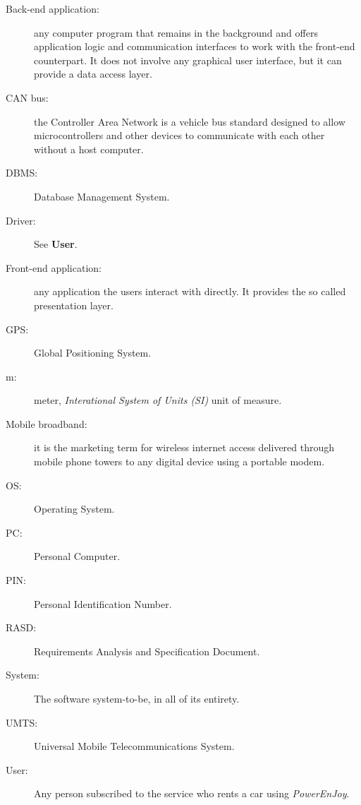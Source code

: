 \begin{description}
\item[Back-end application:] any computer program that remains in the background and offers application logic and communication interfaces to work with the front-end counterpart. It does not involve any graphical user interface, but it can provide a data access layer.
\item[CAN bus:] the Controller Area Network is a vehicle bus standard designed to allow microcontrollers and other devices to communicate with each other without a host computer.
\item[DBMS:] Database Management System.
\item[Driver:] See \textbf{User}.
\item[Front-end application:] any application the users interact with directly. It provides the so called presentation layer.
\item[GPS:] Global Positioning System.
\item[m:] meter, \emph{Interational System of Units (SI)} unit of measure.
\item[Mobile broadband:] it is the marketing term for wireless internet access delivered through mobile phone towers to any digital device using a portable modem.
\item[OS:] Operating System.
\item[PC:] Personal Computer.
\item[PIN:] Personal Identification Number.
\item[RASD:] Requirements Analysis and Specification Document.
\item[System:] The software system-to-be, in all of its entirety.
\item[UMTS:] Universal Mobile Telecommunications System.
\item[User:] Any person subscribed to the service who rents a car using \hbox{\emph{PowerEnJoy}}.
\end{description}

